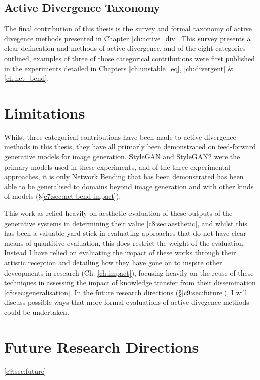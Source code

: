 \subsection{Active Divergence Taxonomy}

The final contribution of this thesis is the survey and formal taxonomy of active divegence methods presented in Chapter \ref{ch:active_div}.
This survey presents a clear delineation and methods of active divergence, and of the eight categories outlined, examples of three of those categorical contributions were first published in the experiments detailed in Chapters \ref{ch:unstable_eq}, \ref{ch:divergent}  \& \ref{ch:net_bend}.

\section{Limitations}

Whilst three categorical contributions have been made to active divergence methods in this thesis, they have all primarly been demonstrated on feed-forward generative models for image generation.
StyleGAN \citep{karras2019style} and StyleGAN2 \citep{karras2019analyzing} were the primary models used in these experiments, and of the three experimental approaches, it is only Network Bending that has been demonstrated has been able to be generalised to domains beyond image generation and with other kinds of models (\S \ref{c7:sec:net-bend-impact}).

This work as relied heavily on aesthetic evaluation of these outputs of the generative systems in determining their value \ref{c8:sec:aesthetic}, and whilst this has been a valuable yard-stick in evaluating approaches that do not have clear means of quantitive evaluation, this does restrict the weight of the evaluation.
Instead I have relied on evaluating the impact of these works through their artistic reception and detailing how they have gone on to inspire other deveopments in research (Ch. \ref{ch:impact}), focusing heavily on the reuse of these techniques in assessing the impact of knowledge transfer from their dissemination \ref{c8:sec:generalisation}.
In the future research directions (\S \ref{c9:sec:future}), I will discuss possible ways that more formal evaluations of active divegence methods could be undertaken.

\section{Future Research Directions}
\ref{c9:sec:future}

